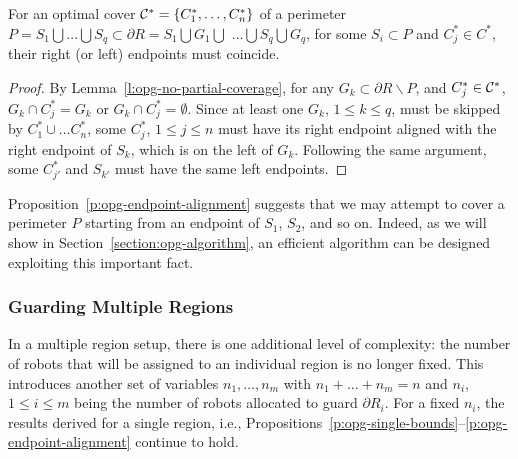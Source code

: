 \begin{proposition}\label{p:opg-endpoint-alignment}
For an optimal cover $\mathcal C^* = \{C_1^*,\ldots, C_n^*\}$ of a perimeter 
$P = S_1 \bigcup \ldots \bigcup S_q \subset \partial R = S_1 \bigcup G_1 
\bigcup $ $\ldots \bigcup S_q \bigcup G_q$, for some $S_i \subset P$ and 
$C_j^* \in C^*$, their right (or left) endpoints must coincide. 
\end{proposition}
\begin{proof}
By Lemma~\ref{l:opg-no-partial-coverage}, for any $G_k \subset \partial R 
\backslash P$, and $C_j^* \in \mathcal C^*$, $G_k \cap C_j^* = G_k$ or 
$G_k \cap C_j^* = \emptyset$. Since at least one $G_k$, $1 \le k \le q$, 
must be skipped by $C_1^* \cup \ldots C_n^*$, some $C_j^*$, $1 \le j \le n$ 
must have its right endpoint aligned with the right endpoint of $S_k$, 
which is on the left of $G_k$. Following the same argument, some 
$C_{j'}^*$ and $S_{k'}$ must have the same left endpoints. 
\end{proof}

Proposition~\ref{p:opg-endpoint-alignment} suggests that we may attempt to cover 
a perimeter $P$ starting from an endpoint of $S_1$, $S_2$, and so on. 
Indeed, as we will show in Section~\ref{section:opg-algorithm}, an efficient 
algorithm can be designed exploiting this important fact. 


\subsubsection{Guarding Multiple Regions}
In a multiple region setup, there is one additional level of complexity:
the number of robots that will be assigned to an individual region is 
no longer fixed. This introduces another set of variables $n_1, \ldots, 
n_m$ with $n_1 + \ldots + n_m = n$ and $n_i$, $1 \le i \le m$ being the 
number of robots allocated to guard $\partial R_i$. For a fixed $n_i$, 
the results derived for a single region, i.e., 
Propositions~\ref{p:opg-single-bounds}--\ref{p:opg-endpoint-alignment} continue 
to hold.


